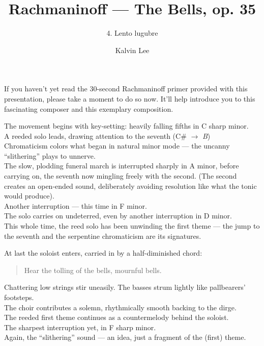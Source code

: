 \documentclass{beamer}
\title{Rachmaninoff --- The Bells, op. 35}
\subtitle{4. Lento lugubre}
\author{Kalvin Lee}
\date{}
\begin{document}
 

\begin{frame} 
  \titlepage
\end{frame} 

\begin{frame} 
  If you haven't yet read the 30-second Rachmaninoff primer provided with this presentation, please take a moment to do so now. It'll help introduce you to this fascinating composer and this exemplary composition. 
\end{frame} 

\begin{frame}
  The movement begins with key-setting: heavily falling fifths in C sharp minor. 
  \pause \\ 
  A reeded solo leads, drawing attention to the seventh (C\# \(\to\) \emph{B}) 
  \pause \\
  Chromaticism colors what began in natural minor mode --- the uncanny ``slithering'' plays to unnerve. 
  \pause \\ 
  The slow, plodding funeral march is interrupted sharply in A minor, \pause before carrying on, the seventh now mingling freely with the second. (The second creates an open-ended sound, deliberately avoiding resolution like what the tonic would produce). 
  \pause \\ 
  Another interruption --- this time in F minor. 
  \pause \\ 
  The solo carries on undeterred, \pause even by another interruption in D minor. 
  \pause \\ 
  This whole time, the reed solo has been unwinding the first theme --- the jump to the seventh and the serpentine chromaticism are its signatures. 
\end{frame} 

\begin{frame}
  At last the soloist enters, carried in by a half-diminished chord: 
  \pause \\ 
  \begin{quote} 
    Hear{\pause} the{\pause} toll{\pause}ing{\pause} of{\pause} the{\pause} bells,{\pause} mourn{\pause}ful{\pause} bells.{\pause} 
  \end{quote} 
  Chattering low strings stir uneasily. The basses strum lightly like pallbearers' footsteps. 
  \pause \\ 
  The choir contributes a solemn, rhythmically smooth backing to the dirge. 
  \pause \\ 
  The reeded first theme continues as a countermelody behind the soloist. 
  \pause \\ 
  The sharpest interruption yet, in F sharp minor. 
  \pause \\ 
  Again, the ``slithering'' sound --- an idea, just a fragment of the (first) theme. 
\end{frame} 
\end{document}
